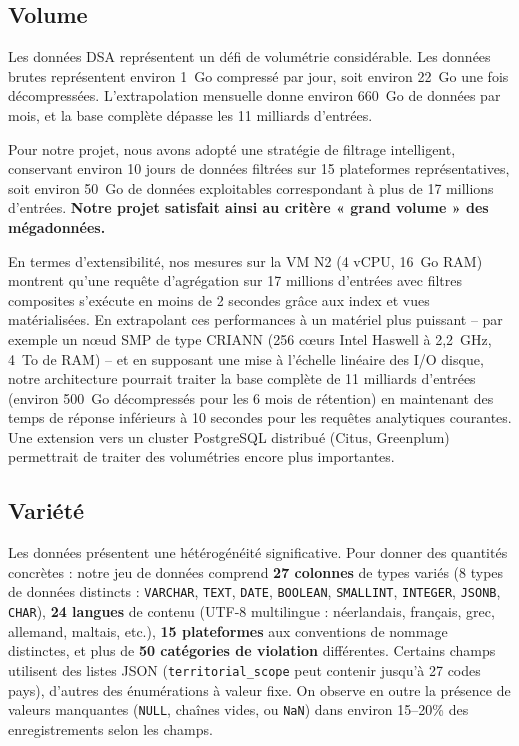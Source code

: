 \documentclass[10pt,twocolumn,a4paper]{article}
\begin{document}
\subsection{Volume}

Les données DSA représentent un défi de volumétrie considérable. Les données brutes représentent environ 1~Go compressé par jour, soit environ 22~Go une fois décompressées. L'extrapolation mensuelle donne environ 660~Go de données par mois, et la base complète dépasse les 11 milliards d'entrées.

Pour notre projet, nous avons adopté une stratégie de filtrage intelligent, conservant environ 10 jours de données filtrées sur 15 plateformes représentatives, soit environ 50~Go de données exploitables correspondant à plus de 17 millions d'entrées. \textbf{Notre projet satisfait ainsi au critère « grand volume » des mégadonnées.}

En termes d'extensibilité, nos mesures sur la VM N2 (4 vCPU, 16~Go RAM) montrent qu'une requête d'agrégation sur 17 millions d'entrées avec filtres composites s'exécute en moins de 2 secondes grâce aux index et vues matérialisées. En extrapolant ces performances à un matériel plus puissant -- par exemple un nœud SMP de type CRIANN (256 cœurs Intel Haswell à 2,2~GHz, 4~To de RAM) -- et en supposant une mise à l'échelle linéaire des I/O disque, notre architecture pourrait traiter la base complète de 11 milliards d'entrées (environ 500~Go décompressés pour les 6 mois de rétention) en maintenant des temps de réponse inférieurs à 10 secondes pour les requêtes analytiques courantes. Une extension vers un cluster PostgreSQL distribué (Citus, Greenplum) permettrait de traiter des volumétries encore plus importantes.

\subsection{Variété}

Les données présentent une hétérogénéité significative. Pour donner des quantités concrètes : notre jeu de données comprend \textbf{27 colonnes} de types variés (8 types de données distincts : \texttt{VARCHAR}, \texttt{TEXT}, \texttt{DATE}, \texttt{BOOLEAN}, \texttt{SMALLINT}, \texttt{INTEGER}, \texttt{JSONB}, \texttt{CHAR}), \textbf{24 langues} de contenu (UTF-8 multilingue : néerlandais, français, grec, allemand, maltais, etc.), \textbf{15 plateformes} aux conventions de nommage distinctes, et plus de \textbf{50 catégories de violation} différentes. Certains champs utilisent des listes JSON (\texttt{territorial\_scope} peut contenir jusqu'à 27 codes pays), d'autres des énumérations à valeur fixe. On observe en outre la présence de valeurs manquantes (\texttt{NULL}, chaînes vides, ou \texttt{NaN}) dans environ 15--20\% des enregistrements selon les champs.
\end{document}
